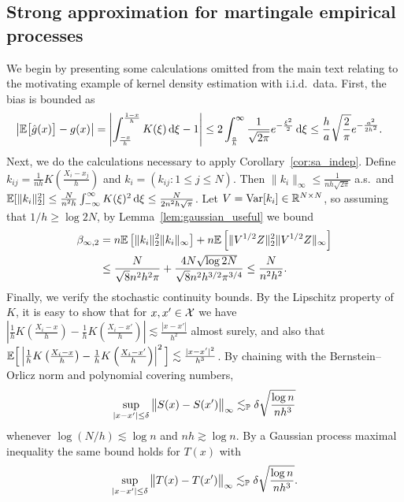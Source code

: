 \subsection{Strong approximation for martingale empirical processes}

We begin by presenting some calculations omitted from the main text
relating to the motivating example of kernel density estimation with
i.i.d.\ data.
First, the bias is bounded as
%
\begin{align*}
  \big| \E \big[ \hat g(x) \big] - g(x) \big|
  &=
  \left|
  \int_{\frac{-x}{h}}^{\frac{1-x}{h}}
  K(\xi)
  \diff \xi
  - 1
  \right|
  \leq
  2 \int_{\frac{a}{h}}^\infty
  \frac{1}{\sqrt{2 \pi}}
  e^{-\frac{\xi^2}{2}}
  \diff \xi
  \leq
  \frac{h}{a}
  \sqrt{\frac{2}{\pi}}
  e^{-\frac{a^2}{2 h^2}}.
\end{align*}
%
Next, we do the calculations necessary to apply
Corollary~\ref{cor:sa_indep}.
Define
$k_{i j} = \frac{1}{n h} K \left( \frac{X_i - x_j}{h} \right)$ and
$k_i = (k_{i j} : 1 \leq j \leq N)$.
Then $\|k_i\|_\infty \leq \frac{1}{n h \sqrt{2 \pi}}$ a.s.\ and
$\E[\|k_i\|_2^2] \leq \frac{N}{n^2 h} \int_{-\infty}^\infty K(\xi)^2 \diff \xi
\leq \frac{N}{2 n^2 h \sqrt{\pi}}$.
Let $V = \Var[k_i] \in \R^{N \times N}$,
so assuming that $1/h \geq \log 2 N$,
by Lemma~\ref{lem:gaussian_useful} we bound
%
\begin{align*}
  \beta_{\infty,2}
  &=
  n \E\left[\| k_i \|^2_2 \| k_i \|_\infty
  \right]
  + n \E \left[ \|V^{1/2} Z \|^2_2 \|V^{1/2} Z \|_\infty \right] \\
  &\leq
  \frac{N}{\sqrt{8} n^2 h^2 \pi}
  + \frac{4 N \sqrt{\log 2 N}}{\sqrt{8} n^2 h^{3/2} \pi^{3/4}}
  \leq
  \frac{N}{n^2 h^2}.
\end{align*}
%
Finally, we verify the stochastic continuity bounds.
By the Lipschitz property of $K$, it is easy to show that
for $x,x' \in \cX$ we have
$\left|\frac{1}{h} K \left( \frac{X_i - x}{h} \right)
- \frac{1}{h} K \left( \frac{X_i - x'}{h} \right)\right|
\lesssim \frac{|x-x'|}{h^2}$ almost surely, and also that
$\E \Big[ \left|\frac{1}{h} K \left( \frac{X_i - x}{h} \right)
- \frac{1}{h} K \left( \frac{X_i - x'}{h} \right)\right|^2 \Big]
\lesssim \frac{|x-x'|^2}{h^3}$.
By chaining with the Bernstein--Orlicz norm and polynomial covering numbers,
%
\begin{align*}
  \sup_{|x-x'| \leq \delta}
  \big\|S(x) - S(x')\big\|_\infty
  \lesssim_\P
  \delta
  \sqrt{\frac{\log n}{n h^3}}
\end{align*}
%
whenever $\log(N/h) \lesssim \log n$
and $n h \gtrsim \log n$.
By a Gaussian process maximal inequality
\citep[Corollary~2.2.8]{van1996weak}
the same bound holds for $T(x)$ with
%
\begin{align*}
  \sup_{|x-x'| \leq \delta}
  \big\|T(x) - T(x')\big\|_\infty
  \lesssim_\P
  \delta
  \sqrt{\frac{\log n}{n h^3}}.
\end{align*}

